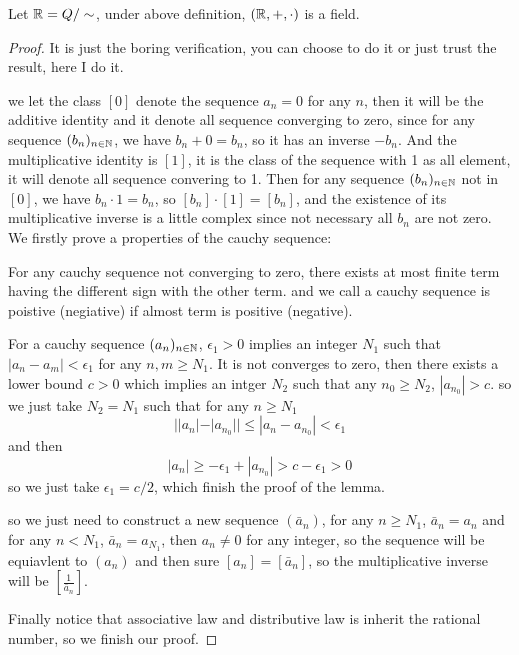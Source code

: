 \documentclass[en,geye,blue,pc,12pt]{elegantnote}
\begin{document}
\begin{proposition}
  Let \(\mathbb{R} = Q/\sim\), under above definition, \((\mathbb{R},+,\cdot)\) is a field.

  \begin{proof}
    It is just the boring verification, you can choose to do it or just trust the result, here I do it. 

    we let the class \([0]\) denote the sequence \(a_n = 0\) for any \(n\), then it will be the additive identity and it denote all sequence converging to zero, since for any sequence \((b_n)_{n \in \mathbb{N}}\), we have \(b_n + 0 = b_n\), so it has an inverse \(-b_n\). And the multiplicative identity is \([1]\), it is the class of the sequence with 1 as all element, it will denote all sequence convering to 1. Then for any sequence \((b_n)_{n \in \mathbb{N}}\) not in \([0]\), we have \(b_n \cdot 1 = b_n\), so \([b_n] \cdot [1] = [b_n]\), and the existence of its multiplicative inverse is a little complex since not necessary all \(b_n\) are not zero. We firstly prove a properties of the cauchy sequence:

    \begin{lemma}
      For any cauchy sequence not converging to zero, there exists at most finite term having the different sign with the other term. and we call a cauchy sequence is poistive (negiative) if almost term is positive (negative).
    \end{lemma}

    For a cauchy sequence \((a_n)_{n \in \mathbb{N}}\), \(\epsilon_1 >0\) implies an integer \(N_1\) such that \(|a_n - a_m| < \epsilon_1\) for any \(n,m \geq N_1\). It is not converges to zero, then there exists a lower bound \(c>0\) which implies an intger \(N_2\) such that any \(n_0 \geq N_2\), \(|a_{n_0}| > c\). so we just take \(N_2 = N_1\) such that for any \(n \geq N_1\)
    \[||a_n|-|a_{n_0}|| \leq |a_n-a_{n_0}| < \epsilon_1 \]
    and then 
    \[|a_n| \geq -\epsilon_1+|a_{n_0}| > c -\epsilon_1 > 0\]
    so we just take \(\epsilon_1 = c/2\), which finish the proof of the lemma.

    so we just need to construct a new sequence \((\bar{a}_n)\), for any \(n \geq N_1\), \(\bar{a}_n = a_n\) and for any \(n < N_1\), \(\bar{a}_n = a_{N_1}\),  then \(a_n \neq 0\) for any integer, so the sequence will be equiavlent to \((a_n)\) and then sure 
    \([a_n] = [\bar{a}_n]\), so the multiplicative inverse will be \([\frac{1}{\bar{a}_n}]\).

    Finally notice that associative law and distributive law is inherit the rational number, so we finish our proof.
  \end{proof}
\end{proposition} 
\end{document}
